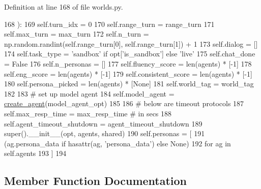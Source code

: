 Definition at line 168 of file worlds.\+py.


\begin{DoxyCode}
168     ):
169         self.turn\_idx = 0
170         self.range\_turn = range\_turn
171         self.max\_turn = max\_turn
172         self.n\_turn = np.random.randint(self.range\_turn[0], self.range\_turn[1]) + 1
173         self.dialog = []
174         self.task\_type = \textcolor{stringliteral}{'sandbox'} \textcolor{keywordflow}{if} opt[\textcolor{stringliteral}{'is\_sandbox'}] \textcolor{keywordflow}{else} \textcolor{stringliteral}{'live'}
175         self.chat\_done = \textcolor{keyword}{False}
176         self.n\_personas = []
177         self.fluency\_score = len(agents) * [-1]
178         self.eng\_score = len(agents) * [-1]
179         self.consistent\_score = len(agents) * [-1]
180         self.persona\_picked = len(agents) * [\textcolor{keywordtype}{None}]
181         self.world\_tag = world\_tag
182 
183         \textcolor{comment}{# set up model agent}
184         self.model\_agent = \hyperlink{namespaceparlai_1_1core_1_1agents_ad0d54074d4bcc148bb415ab5515a53b5}{create\_agent}(model\_agent\_opt)
185 
186         \textcolor{comment}{# below are timeout protocols}
187         self.max\_resp\_time = max\_resp\_time  \textcolor{comment}{# in secs}
188         self.agent\_timeout\_shutdown = agent\_timeout\_shutdown
189         super().\_\_init\_\_(opt, agents, shared)
190         self.personas = [
191             (ag.persona\_data \textcolor{keywordflow}{if} hasattr(ag, \textcolor{stringliteral}{'persona\_data'}) \textcolor{keywordflow}{else} \textcolor{keywordtype}{None})
192             \textcolor{keywordflow}{for} ag \textcolor{keywordflow}{in} self.agents
193         ]
194 
\end{DoxyCode}


\subsection{Member Function Documentation}
\mbox{\label{classpersonachat__eval_1_1worlds_1_1PersonaChatEvalWorld_a679af39a8c51b3721340baea526f1f41}} 

